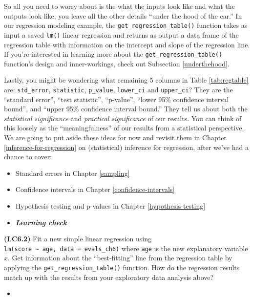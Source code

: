 \documentclass[12pt, krantz2,]{krantz}
\providecommand{\tightlist}{%
  \setlength{\itemsep}{0pt}\setlength{\parskip}{0pt}}
\newenvironment{rmdblock}[1]
  {\begin{shaded*}
  \begin{itemize}
  \renewcommand{\labelitemi}{
    \raisebox{-.7\height}[0pt][0pt]{
    }
  }
  \item
  }
  {
  \end{itemize}
  \end{shaded*}
  }
\newenvironment{learncheck}
  {\begin{rmdblock}{warning}}
  {\end{rmdblock}}
\begin{document}
So all you need to worry about is the what the inputs look like and what the outputs look like; you leave all the other details ``under the hood of the car.'' In our regression modeling example, the \texttt{get\_regression\_table()} function takes as input a saved \texttt{lm()} linear regression and returns as output a data frame of the regression table with information on the intercept and slope of the regression line. If you're interested in learning more about the \texttt{get\_regression\_table()} function's design and inner-workings, check out Subsection \ref{underthehood}.

Lastly, you might be wondering what remaining 5 columns in Table \ref{tab:regtable} are: \texttt{std\_error}, \texttt{statistic}, \texttt{p\_value}, \texttt{lower\_ci} and \texttt{upper\_ci}? They are the ``standard error'', ``test statistic'', ``p-value'', ``lower 95\% confidence interval bound'', and ``upper 95\% confidence interval bound.'' They tell us about both the \emph{statistical significance} and \emph{practical significance} of our results. You can think of this loosely as the ``meaningfulness'' of our results from a statistical perspective. We are going to put aside these ideas for now and revisit them in Chapter \ref{inference-for-regression} on (statistical) inference for regression, after we've had a chance to cover:

\begin{itemize}
\tightlist
\item
  Standard errors in Chapter \ref{sampling}
\item
  Confidence intervals in Chapter \ref{confidence-intervals}
\item
  Hypothesis testing and p-values in Chapter \ref{hypothesis-testing}
\end{itemize}

\begin{learncheck}
\textbf{\emph{Learning check}}
\end{learncheck}

\textbf{(LC6.2)} Fit a new simple linear regression using \texttt{lm(score\ \textasciitilde{}\ age,\ data\ =\ evals\_ch6)} where \texttt{age} is the new explanatory variable \(x\). Get information about the ``best-fitting'' line from the regression table by applying the \texttt{get\_regression\_table()} function. How do the regression results match up with the results from your exploratory data analysis above?

\begin{learncheck}

\end{learncheck}
\end{document}
